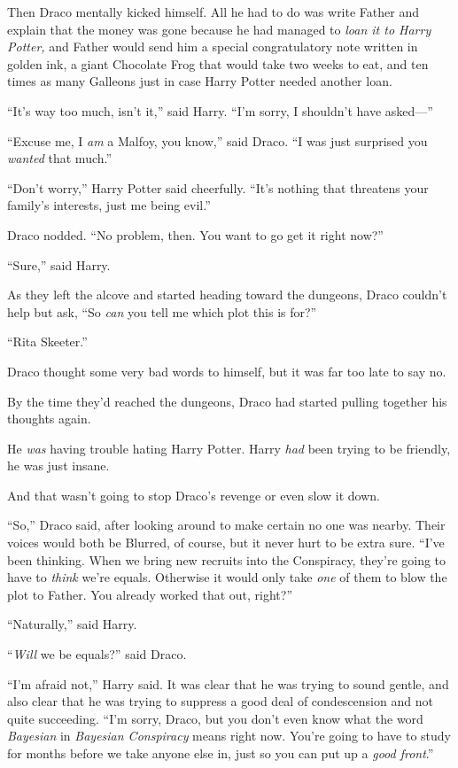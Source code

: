 Then Draco mentally kicked himself. All he had to do was write Father and explain that the money was gone because he had managed to \emph{loan it to Harry Potter,} and Father would send him a special congratulatory note written in golden ink, a giant Chocolate Frog that would take two weeks to eat, and ten times as many Galleons just in case Harry Potter needed another loan.

“It’s way too much, isn’t it,” said Harry. “I’m sorry, I shouldn’t have asked—”

“Excuse me, I \emph{am} a Malfoy, you know,” said Draco. “I was just surprised you \emph{wanted} that much.”

“Don’t worry,” Harry Potter said cheerfully. “It’s nothing that threatens your family’s interests, just me being evil.”

Draco nodded. “No problem, then. You want to go get it right now?”

“Sure,” said Harry.

As they left the alcove and started heading toward the dungeons, Draco couldn’t help but ask, “So \emph{can} you tell me which plot this is for?”

“Rita Skeeter.”

Draco thought some very bad words to himself, but it was far too late to say no.

\later

By the time they’d reached the dungeons, Draco had started pulling together his thoughts again.

He \emph{was} having trouble hating Harry Potter. Harry \emph{had} been trying to be friendly, he was just insane.

And that wasn’t going to stop Draco’s revenge or even slow it down.

“So,” Draco said, after looking around to make certain no one was nearby. Their voices would both be Blurred, of course, but it never hurt to be extra sure. “I’ve been thinking. When we bring new recruits into the Conspiracy, they’re going to have to \emph{think} we’re equals. Otherwise it would only take \emph{one} of them to blow the plot to Father. You already worked that out, right?”

“Naturally,” said Harry.

“\emph{Will} we be equals?” said Draco.

“I’m afraid not,” Harry said. It was clear that he was trying to sound gentle, and also clear that he was trying to suppress a good deal of condescension and not quite succeeding. “I’m sorry, Draco, but you don’t even know what the word \emph{Bayesian} in \emph{Bayesian Conspiracy} means right now. You’re going to have to study for months before we take anyone else in, just so you can put up a \emph{good front}.”

